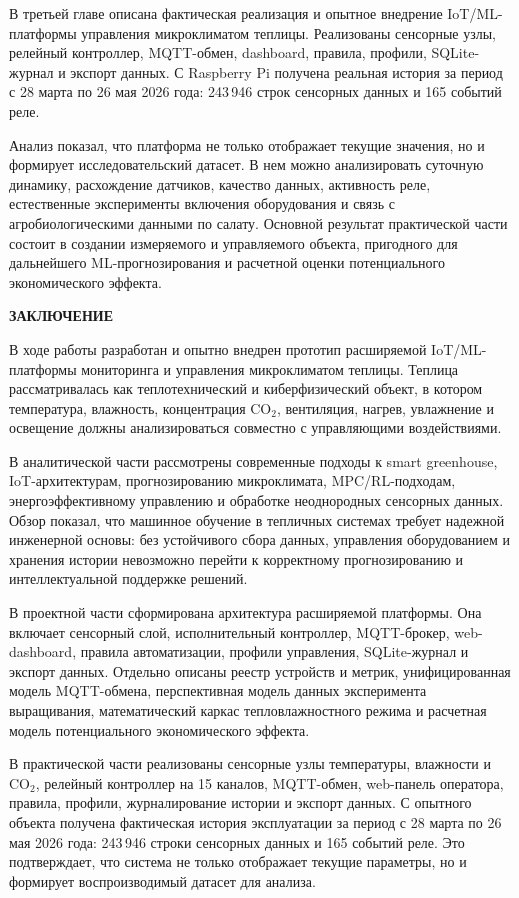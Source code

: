 \documentclass[a4paper,14pt]{extarticle}
\newcommand{\VkrStructuralSection}[1]{%
  \FloatBarrier
  \clearpage
  \phantomsection
  \addcontentsline{toc}{section}{#1}%
  \begin{center}\bfseries #1\end{center}%
  \par\nopagebreak\vspace{12pt}%
}
\begin{document}
В третьей главе описана фактическая реализация и опытное внедрение
IoT/ML-платформы управления микроклиматом теплицы. Реализованы сенсорные
узлы, релейный контроллер, MQTT-обмен, dashboard, правила, профили,
SQLite-журнал и экспорт данных. С Raspberry Pi получена реальная история
за период с 28 марта по 26 мая 2026 года: 243\,946 строк сенсорных
данных и 165 событий реле.

Анализ показал, что платформа не только отображает текущие значения, но
и формирует исследовательский датасет. В нем можно анализировать
суточную динамику, расхождение датчиков, качество данных, активность
реле, естественные эксперименты включения оборудования и связь с
агробиологическими данными по салату. Основной результат практической
части состоит в создании измеряемого и управляемого объекта, пригодного
для дальнейшего ML-прогнозирования и расчетной оценки потенциального
экономического эффекта.

\hypertarget{ux437ux430ux43aux43bux44eux447ux435ux43dux438ux435}{%
\VkrStructuralSection{ЗАКЛЮЧЕНИЕ}\label{ux437ux430ux43aux43bux44eux447ux435ux43dux438ux435}}

В ходе работы разработан и опытно внедрен прототип расширяемой
IoT/ML-платформы мониторинга и управления микроклиматом теплицы. Теплица
рассматривалась как теплотехнический и киберфизический объект, в котором
температура, влажность, концентрация CO\(_2\), вентиляция, нагрев,
увлажнение и освещение должны анализироваться совместно с управляющими
воздействиями.

В аналитической части рассмотрены современные подходы к smart
greenhouse, IoT-архитектурам, прогнозированию микроклимата,
MPC/RL-подходам, энергоэффективному управлению и обработке неоднородных
сенсорных данных. Обзор показал, что машинное обучение в тепличных
системах требует надежной инженерной основы: без устойчивого сбора
данных, управления оборудованием и хранения истории невозможно перейти к
корректному прогнозированию и интеллектуальной поддержке решений.

В проектной части сформирована архитектура расширяемой платформы. Она
включает сенсорный слой, исполнительный контроллер, MQTT-брокер,
web-dashboard, правила автоматизации, профили управления, SQLite-журнал
и экспорт данных. Отдельно описаны реестр устройств и метрик,
унифицированная модель MQTT-обмена, перспективная модель данных
эксперимента выращивания, математический каркас тепловлажностного режима
и расчетная модель потенциального экономического эффекта.

В практической части реализованы сенсорные узлы температуры, влажности и
CO\(_2\), релейный контроллер на 15 каналов, MQTT-обмен, web-панель
оператора, правила, профили, журналирование истории и экспорт данных. С
опытного объекта получена фактическая история эксплуатации за период с
28 марта по 26 мая 2026 года: 243\,946 строки сенсорных данных и 165
событий реле. Это подтверждает, что система не только отображает текущие
параметры, но и формирует воспроизводимый датасет для анализа.
\end{document}
